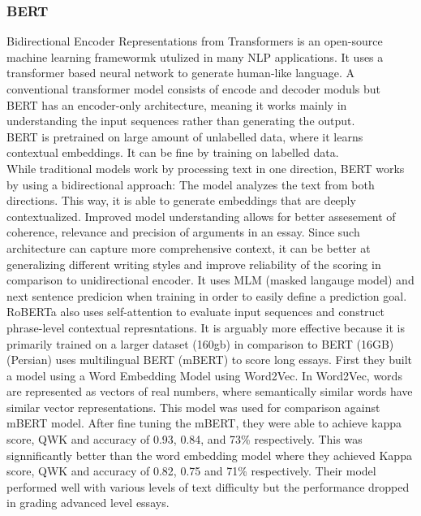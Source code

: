 \documentclass{article}
\begin{document}
\subsubsection*{BERT}
Bidirectional Encoder Representations from Transformers is an open-source machine learning framewormk utulized in many NLP applications. It uses a transformer based neural network to generate human-like language. A conventional transformer model consists of encode and decoder moduls but BERT has an encoder-only architecture, meaning it works mainly in understanding the input sequences rather than generating the output. \\ BERT is pretrained on large amount of unlabelled data, where it learns contextual embeddings. It can be fine by training on labelled data. \\ While traditional models work by processing text in one direction, BERT works by using a bidirectional approach: The model analyzes the text from both directions. This way, it is able to generate embeddings that are deeply contextualized. Improved model understanding allows for better assesement of coherence, relevance and precision of arguments in an essay. Since such architecture can capture more comprehensive context, it can be better at generalizing different writing styles and improve reliability of the scoring in comparison to unidirectional encoder. It uses MLM (masked langauge model) and next sentence predicion when training in order to easily define a prediction goal. RoBERTa also uses self-attention to evaluate input sequences and construct phrase-level contextual represntations. It is arguably more effective because it is primarily trained on a larger dataset (160gb) in comparison to BERT (16GB) \\
\textbf{\textcite{9_firoozi2024bert}} (Persian) uses multilingual BERT (mBERT) to score long essays. First they built a model using a Word Embedding Model using Word2Vec. In Word2Vec, words are represented as vectors of real numbers, where semantically similar words have similar vector representations. This model was used for comparison against mBERT model. After fine tuning the mBERT, they were able to achieve kappa score, QWK and accuracy of 0.93, 0.84, and 73\% respectively. This was signnificantly better than the word embedding model where they achieved Kappa score, QWK and accuracy of 0.82, 0.75 and 71\% respectively. Their model performed well with various levels of text difficulty but the performance dropped in grading advanced level essays. 
\end{document}
